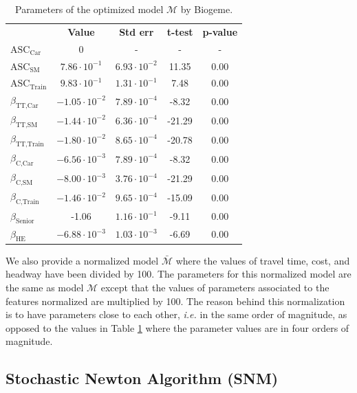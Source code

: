 \documentclass[conference]{IEEEtran}
\newcommand{\E}[1]{\cdot10^{#1}}
\begin{document}
\begin{table}
\centering
\renewcommand\arraystretch{1.2}
\begin{tabular}{l|cccc}
\multicolumn{1}{l}{} & {\bf Value} & {\bf Std err} & {\bf t-test} & {\bf p-value} \\ \cline{2-5}
$\text{ASC}_{\text{Car}}$ & 0 & - & - & - \\
$\text{ASC}_{\text{SM}}$ & $7.86\E{-1}$ & $6.93\E{-2}$ & 11.35 & 0.00 \\
$\text{ASC}_{\text{Train}}$ & $9.83\E{-1}$ & $1.31\E{-1}$ & 7.48 & 0.00 \\
$\beta_{\text{TT,Car}}$ & $-1.05\E{-2}$ & $7.89\E{-4}$ & -8.32 & 0.00 \\
$\beta_{\text{TT,SM}}$ & $-1.44\E{-2}$ & $6.36\E{-4}$ & -21.29 & 0.00 \\
$\beta_{\text{TT,Train}}$ & $-1.80\E{-2}$ & $8.65\E{-4}$ & -20.78 & 0.00 \\
$\beta_{\text{C,Car}}$ & $-6.56\E{-3}$ & $7.89\E{-4}$ & -8.32 & 0.00 \\
$\beta_{\text{C,SM}}$ & $-8.00\E{-3}$ & $3.76\E{-4}$ & -21.29 & 0.00 \\
$\beta_{\text{C,Train}}$ & $-1.46\E{-2}$ & $9.65\E{-4}$ & -15.09 & 0.00 \\
$\beta_{\text{Senior}}$ & -1.06 & $1.16\E{-1}$ & -9.11 & 0.00 \\
$\beta_{\text{HE}}$ & $-6.88\E{-3}$ & $1.03\E{-3}$ & -6.69 & 0.00
\end{tabular}
\caption{\label{tab:res_biogeme} Parameters of the optimized model $\mathcal{M}$ by Biogeme.}
\vspace{-0.8cm}
\end{table}

We also provide a normalized model $\bar{\mathcal{M}}$ where the values of travel time, cost, and headway have been divided by 100. The parameters for this normalized model are the same as model $\mathcal{M}$ except that the values of parameters associated to the features normalized are multiplied by 100. The reason behind this normalization is to have parameters close to each other, {\it i.e.} in the same order of magnitude, as opposed to the values in Table \ref{tab:res_biogeme} where the parameter values are in four orders of magnitude. \\

\vspace{-0.3cm}
\subsection{Stochastic Newton Algorithm (SNM)}
\label{sec:snm}
\end{document}

